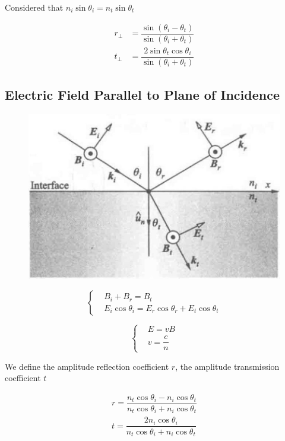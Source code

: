Considered that $n_i \sin \theta_i = n_t \sin \theta_t$

\begin{equation*}
  \begin{aligned}
    r_{\perp} &= \dfrac{\sin \left( \theta_i - \theta_t \right)}{\sin \left( \theta_i + \theta_t \right)} \\
    t_{\perp} &= \dfrac{2 \sin \theta_t \cos \theta_i}{\sin \left( \theta_i + \theta_t \right)} 
  \end{aligned}
\end{equation*}

\subsection{Electric Field Parallel to Plane of Incidence}

\begin{figure}[H]
  \centering
  \includegraphics[width=0.5\linewidth]{figures/Fresnel-parallel}
  \label{fig:}
\end{figure}

\begin{equation*}
 \left\{
  \begin{aligned}
    & B_i + B_r = B_t \\
    & E_i \cos \theta_i = E_r \cos \theta_r + E_t \cos \theta_t
  \end{aligned}
  \right.
\end{equation*}

\begin{equation*}
  \left\{
  \begin{aligned}
    & E = v B \\
    & v = \dfrac{c}{n}
  \end{aligned}
  \right.
\end{equation*}

We define the amplitude reflection coefficient $r$, the amplitude transmission coefficient $t$

\begin{equation*}
  \begin{aligned}
    r = \dfrac{n_t \cos \theta_i - n_i \cos \theta_t}{n_t \cos \theta_i + n_i \cos \theta_t} \\
    t = \dfrac{2 n_i \cos \theta_i}{n_t \cos \theta_i + n_i \cos \theta_t} 
  \end{aligned}
\end{equation*}

